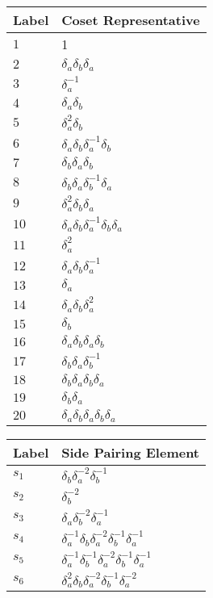 \documentclass{article}
\begin{document}
\begin{center}
\begin{tabular}{ll}
\toprule
Label & Coset Representative\\
\midrule
$1$ & 1 \\
$2$ & $\delta_a^{}\delta_b^{}\delta_a^{}$ \\
$3$ & $\delta_a^{-1}$ \\
$4$ & $\delta_a^{}\delta_b^{}$ \\
$5$ & $\delta_a^{2}\delta_b^{}$ \\
$6$ & $\delta_a^{}\delta_b^{}\delta_a^{-1}\delta_b^{}$ \\
$7$ & $\delta_b^{}\delta_a^{}\delta_b^{}$ \\
$8$ & $\delta_b^{}\delta_a^{}\delta_b^{-1}\delta_a^{}$ \\
$9$ & $\delta_a^{2}\delta_b^{}\delta_a^{}$ \\
$10$ & $\delta_a^{}\delta_b^{}\delta_a^{-1}\delta_b^{}\delta_a^{}$ \\
$11$ & $\delta_a^{2}$ \\
$12$ & $\delta_a^{}\delta_b^{}\delta_a^{-1}$ \\
$13$ & $\delta_a^{}$ \\
$14$ & $\delta_a^{}\delta_b^{}\delta_a^{2}$ \\
$15$ & $\delta_b^{}$ \\
$16$ & $\delta_a^{}\delta_b^{}\delta_a^{}\delta_b^{}$ \\
$17$ & $\delta_b^{}\delta_a^{}\delta_b^{-1}$ \\
$18$ & $\delta_b^{}\delta_a^{}\delta_b^{}\delta_a^{}$ \\
$19$ & $\delta_b^{}\delta_a^{}$ \\
$20$ & $\delta_a^{}\delta_b^{}\delta_a^{}\delta_b^{}\delta_a^{}$ \\
\bottomrule
\end{tabular}
\hfill
\begin{tabular}{ll}
\toprule
Label & Side Pairing Element\\
\midrule
$s_{1}$ & $\delta_b^{}\delta_a^{-2}\delta_b^{-1}$ \\
$s_{2}$ & $\delta_b^{-2}$ \\
$s_{3}$ & $\delta_a^{}\delta_b^{-2}\delta_a^{-1}$ \\
$s_{4}$ & $\delta_a^{-1}\delta_b^{}\delta_a^{-2}\delta_b^{-1}\delta_a^{-1}$ \\
$s_{5}$ & $\delta_a^{-1}\delta_b^{-1}\delta_a^{-2}\delta_b^{-1}\delta_a^{-1}$ \\
$s_{6}$ & $\delta_a^{2}\delta_b^{}\delta_a^{-2}\delta_b^{-1}\delta_a^{-2}$ \\

\end{tabular}
\end{center}
\end{document}
